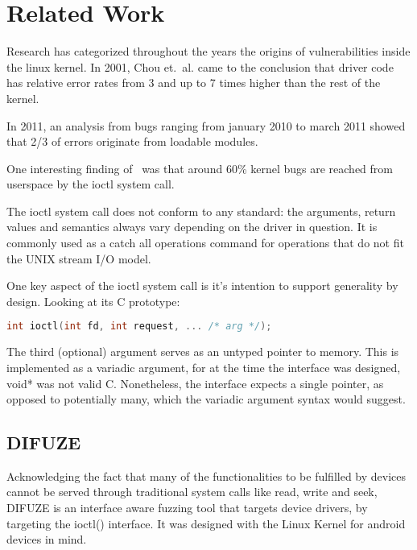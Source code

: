 \section{Related Work}\label{s:related-work}


Research has categorized throughout the years the origins of
vulnerabilities inside the linux kernel. In 2001,  Chou et.~al.
came to the conclusion that driver code has relative error rates
from 3 and up to 7 times higher than the rest of the kernel\cite{chouEmpiricalStudyOperating2001}.

In 2011, an analysis from bugs ranging from january 2010 to march 2011
showed that 2/3 of errors originate from loadable modules\cite{chenLinuxKernelVulnerabilities2011}.

One interesting finding of~\cite{vanderstoepAndroidProtectingKernel2016} was that around 60\% kernel bugs
are reached from userspace by the ioctl system call.

The ioctl system call does not conform to any standard: the arguments, return values and semantics always vary
depending on the driver in question. It is commonly used as a catch all operations command for
operations that do not fit the UNIX stream I/O model.

One key aspect of the ioctl system call is it's intention to support generality by design.
Looking at its C prototype:

\begin{lstlisting}[language=c]
  int ioctl(int fd, int request, ... /* arg */);
\end{lstlisting}

The third (optional) argument serves as an untyped pointer to memory. This is implemented as a variadic argument, for at the time
the interface was designed, void* was not valid C. Nonetheless, the interface expects a single pointer, as opposed to potentially
many, which the variadic argument syntax would suggest.

\subsection{DIFUZE}\label{ss:difuze}

Acknowledging the fact that many of the functionalities to be fulfilled
by devices cannot be served through traditional system calls like read, write
and seek, DIFUZE is an interface aware fuzzing tool that targets
device drivers, by targeting the ioctl() interface\cite{corinaDIFUZEInterfaceAware2017}.
It was designed with the Linux Kernel for android devices in mind.

